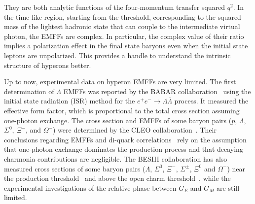 \documentclass[a4paper,11pt]{article}
\begin{document}
They are both analytic functions of the four-momentum transfer squared $q^2$. 
In the time-like region, starting from the threshold, corresponding to the squared mass of the lightest hadronic state that can couple to the intermediate virtual photon, the EMFFs are complex. In particular, the complex value of their ratio implies a polarization effect in the final state baryons even when the initial state leptons are unpolarized. 
This provides a handle to understand the intrinsic structure of hyperons better.

Up to now, experimental data on hyperon EMFFs are very limited. The first 
determination of $\Lambda$ EMFFs was reported by the BABAR collaboration~\cite{Aubert:2007uf} using the initial state radiation (ISR) method for the $e^+e^- \to \Lambda\bar\Lambda$ process. It measured the effective form factor, which is proportional to the total cross section assuming one-photon exchange. The cross section and EMFFs of some baryon pairs ($p$, $\Lambda$, $\Sigma^0$, $\Xi^-$, and $\Omega^-$) were determined by the CLEO collaboration~\cite{Dobbs:2014ifa,Dobbs:2017}. Their conclusions regarding EMFFs and di-quark correlations~\cite{Jafee:2005,Jafee:2003} rely on the assumption that one-photon exchange dominates the production process and that decaying charmonia contributions are negligible. 
The BESIII collaboration has also measured cross sections of some baryon pairs ($\Lambda$, $\Sigma^0$, $\Xi^-$, $\Sigma^\pm$, $\Xi^0$ and $\Omega^-$) near the production threshold~\cite{BESIII:2017hyw, BESIII:2020uqk, BESIII:2020ktn, BESIII:2021aer, BESIII:2021rkn, BESIII:2022kzc}
and above the open charm threshold~\cite{BESIII:2019cuv, BESIII:2023rse, BESIII:2021ccp}, 
while the experimental investigations of the relative phase between $G_E$ and $G_M$ are still limited.
\end{document}
